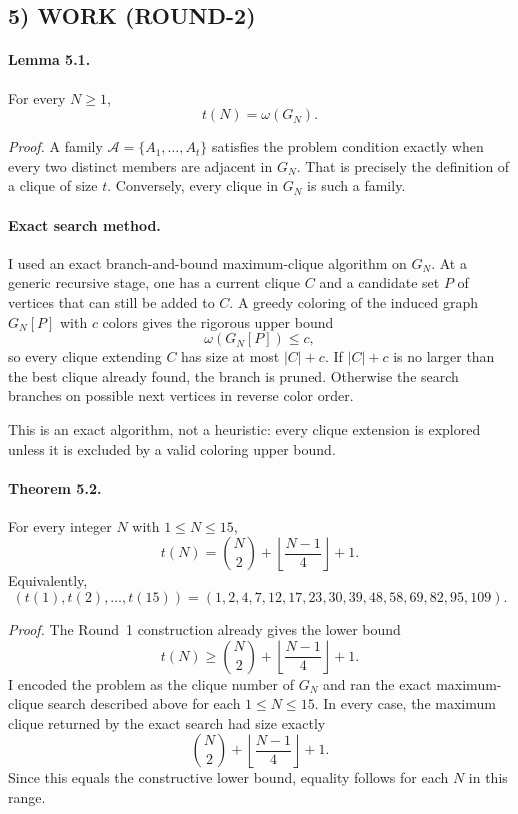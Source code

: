 \subsection*{5) WORK (ROUND-2)}

\paragraph{Lemma 5.1.}
For every $N\ge 1$,
\[
t(N)=\omega(G_N).
\]

\emph{Proof.}
A family $\mathcal A=\{A_1,\dots,A_t\}$ satisfies the problem condition exactly when every two distinct members are adjacent in $G_N$. That is precisely the definition of a clique of size $t$. Conversely, every clique in $G_N$ is such a family. 

\paragraph{Exact search method.}
I used an exact branch-and-bound maximum-clique algorithm on $G_N$.
At a generic recursive stage, one has a current clique $C$ and a candidate set $P$ of vertices that can still be added to $C$.
A greedy coloring of the induced graph $G_N[P]$ with $c$ colors gives the rigorous upper bound
\[
\omega(G_N[P])\le c,
\]
so every clique extending $C$ has size at most $|C|+c$.
If $|C|+c$ is no larger than the best clique already found, the branch is pruned.
Otherwise the search branches on possible next vertices in reverse color order.

This is an exact algorithm, not a heuristic: every clique extension is explored unless it is excluded by a valid coloring upper bound.

\paragraph{Theorem 5.2.}
For every integer $N$ with $1\le N\le 15$,
\[
t(N)=\binom{N}{2}+\left\lfloor\frac{N-1}{4}\right\rfloor+1.
\]
Equivalently,
\[
(t(1),t(2),\dots,t(15))
=
(1,2,4,7,12,17,23,30,39,48,58,69,82,95,109).
\]

\emph{Proof.}
The Round~1 construction already gives the lower bound
\[
t(N)\ge \binom{N}{2}+\left\lfloor\frac{N-1}{4}\right\rfloor+1.
\]
I encoded the problem as the clique number of $G_N$ and ran the exact maximum-clique search described above for each $1\le N\le 15$.
In every case, the maximum clique returned by the exact search had size exactly
\[
\binom{N}{2}+\left\lfloor\frac{N-1}{4}\right\rfloor+1.
\]
Since this equals the constructive lower bound, equality follows for each $N$ in this range. 

